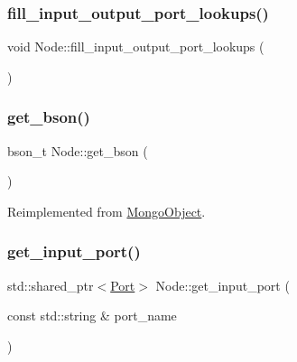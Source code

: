 \subsubsection{\texorpdfstring{fill\+\_\+input\+\_\+output\+\_\+port\+\_\+lookups()}{fill\_input\_output\_port\_lookups()}}
{\footnotesize\ttfamily void Node\+::fill\+\_\+input\+\_\+output\+\_\+port\+\_\+lookups (\begin{DoxyParamCaption}{ }\end{DoxyParamCaption})\hspace{0.3cm}{\ttfamily [protected]}}

\mbox{\label{class_node_a9568e1bba3436d78e77862902e328592}} 
\subsubsection{\texorpdfstring{get\+\_\+bson()}{get\_bson()}}
{\footnotesize\ttfamily bson\+\_\+t Node\+::get\+\_\+bson (\begin{DoxyParamCaption}{ }\end{DoxyParamCaption})\hspace{0.3cm}{\ttfamily [virtual]}}



Reimplemented from \hyperlink{class_mongo_object_ac21cbe104a818f7e6ee7dcfbb521e9e1}{Mongo\+Object}.

\mbox{\label{class_node_a89e7f8e74b09395e5a2362bcef664ee9}} 
\subsubsection{\texorpdfstring{get\+\_\+input\+\_\+port()}{get\_input\_port()}}
{\footnotesize\ttfamily std\+::shared\+\_\+ptr$<$\hyperlink{class_port}{Port}$>$ Node\+::get\+\_\+input\+\_\+port (\begin{DoxyParamCaption}\item[{const std\+::string \&}]{port\+\_\+name }\end{DoxyParamCaption})}

\mbox{\label{class_node_aab2f990047525bd3bfe7be041a8a201c}} 
